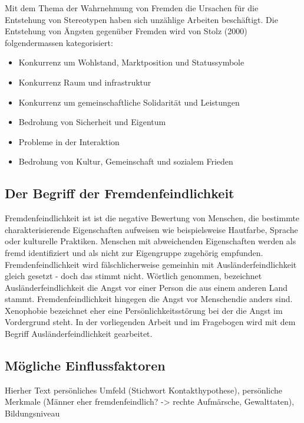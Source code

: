 \documentclass[]{article}
\providecommand{\tightlist}{%
  \setlength{\itemsep}{0pt}\setlength{\parskip}{0pt}}
\begin{document}
Mit dem Thema der Wahrnehmung von Fremden die Ursachen für die
Entstehung von Stereotypen haben sich unzählige Arbeiten beschäftigt.
Die Entstehung von Ängsten gegenüber Fremden wird von Stolz (2000)
folgendermassen kategorisiert:

\begin{itemize}
\tightlist
\item
  Konkurrenz um Wohlstand, Marktposition und Statussymbole
\item
  Konkurrenz Raum und infrastruktur
\item
  Konkurrenz um gemeinschaftliche Solidarität und Leistungen
\item
  Bedrohung von Sicherheit und Eigentum
\item
  Probleme in der Interaktion
\item
  Bedrohung von Kultur, Gemeinschaft und sozialem Frieden
\end{itemize}

\subsection{Der Begriff der
Fremdenfeindlichkeit}\label{der-begriff-der-fremdenfeindlichkeit}

Fremdenfeindlichkeit ist ist die negative Bewertung von Menschen, die
bestimmte charakterisierende Eigenschaften aufweisen wie beispielsweise
Hautfarbe, Sprache oder kulturelle Praktiken. Menschen mit abweichenden
Eigenschaften werden als fremd identifiziert und als nicht zur
Eigengruppe zugehörig empfunden. Fremdenfeindlichkeit wird
fälschlicherweise gemeinhin mit Ausländerfeindlichkeit gleich gesetzt -
doch das stimmt nicht. Wörtlich genommen, bezeichnet
Ausländerfeindlichkeit die Angst vor einer Person die aus einem anderen
Land stammt. Fremdenfeindlichkeit hingegen die Angst vor Menschendie
anders sind. Xenophobie bezeichnet eher eine Persönlichkeitsstörung bei
der die Angst im Vordergrund steht. In der vorliegenden Arbeit und im
Fragebogen wird mit dem Begriff Ausländerfeindlichkeit gearbeitet.

\subsection{Mögliche Einflussfaktoren}\label{mogliche-einflussfaktoren}

Hierher Text persönliches Umfeld (Stichwort Kontakthypothese),
persönliche Merkmale (Männer eher fremdenfeindlich? -\textgreater{}
rechte Aufmärsche, Gewalttaten), Bildungsniveau
\end{document}
